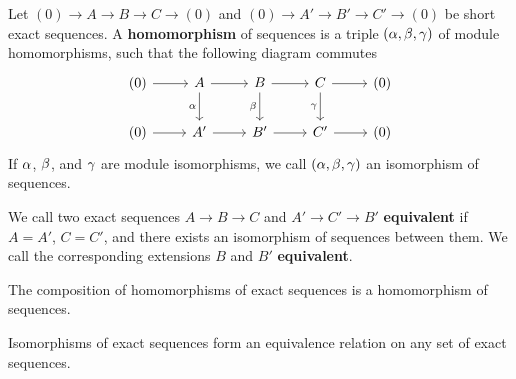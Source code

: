 \begin{definition}
    Let $(0) \xrightarrow{} A \xrightarrow{} B \xrightarrow{} C \xrightarrow{}
    (0)$ and $(0) \xrightarrow{} A' \xrightarrow{} B' \xrightarrow{} C'
    \xrightarrow{} (0)$ be short exact sequences. A \textbf{homomorphism} of
    sequences is a triple $(\alpha,\beta,\gamma)$ of module homomorphisms, such that the
    following diagram commutes
    \begin{equation*}
        \begin{tikzcd}
            {(0)} & A & B & C & {(0)} \\
            {(0)} & {A'} & {B'} & {C'} & {(0)}
            \arrow[from=1-1, to=1-2]
            \arrow[from=1-2, to=1-3]
            \arrow[from=1-3, to=1-4]
            \arrow[from=1-4, to=1-5]
            \arrow[from=2-1, to=2-2]
            \arrow[from=2-2, to=2-3]
            \arrow[from=2-3, to=2-4]
            \arrow[from=2-4, to=2-5]
            \arrow["\gamma"', from=1-4, to=2-4]
            \arrow["\beta"', from=1-3, to=2-3]
            \arrow["\alpha"', from=1-2, to=2-2]
        \end{tikzcd}
    \end{equation*}
    If $\alpha$,  $\beta$, and  $\gamma$ are  module isomorphisms, we call $(\alpha,\beta,\gamma)$ an
    isomorphism of sequences.
\end{definition}


\begin{definition}
    We call two exact sequences $A \xrightarrow{} B \xrightarrow{} C$ and $A'
    \xrightarrow{} C' \xrightarrow{} B'$ \textbf{equivalent} if $A=A'$, $C=C'$,
    and there exists an isomorphism of sequences between them. We call  the
    corresponding extensions  $B$ and  $B'$  \textbf{equivalent}.
\end{definition}

\begin{lemma}\label{4.5.3}
    The composition of homomorphisms of exact sequences is a homomorphism
    of sequences.
\end{lemma}

\begin{lemma}\label{4.5.4}
    Isomorphisms of exact sequences form an equivalence relation on any set of
    exact sequences.
\end{lemma}

